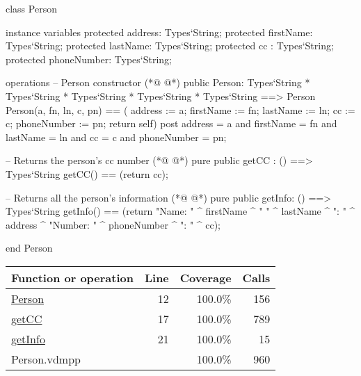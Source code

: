 \begin{vdmpp}[breaklines=true]
class Person

instance variables
  protected address: Types`String;
  protected firstName: Types`String;
  protected lastName: Types`String;
  protected cc : Types`String;
  protected phoneNumber: Types`String;
  
operations
 -- Person constructor
(*@
\label{Person:12}
@*)
 public Person: Types`String * Types`String * Types`String * Types`String * Types`String ==> Person
  Person(a, fn, ln, c, pn) == ( address := a; firstName := fn; lastName := ln; cc := c; phoneNumber := pn; return self)
 post address = a and firstName = fn and lastName = ln and cc = c and phoneNumber = pn;
 
 -- Returns the person's cc number
(*@
\label{getCC:17}
@*)
 pure public getCC : () ==> Types`String
  getCC() == (return cc);
 
 -- Returns all the person's information
(*@
\label{getInfo:21}
@*)
 pure public getInfo: () ==> Types`String
  getInfo() == (return "Name: " ^ firstName ^ " " ^ lastName ^ "\nAddress: " ^ address ^ "\nPhone Number: " ^ phoneNumber ^ "\nCC: " ^ cc);

end Person
\end{vdmpp}
\bigskip
\begin{longtable}{|l|r|r|r|}
\hline
Function or operation & Line & Coverage & Calls \\
\hline
\hline
\hyperref[Person:12]{Person} & 12&100.0\% & 156 \\
\hline
\hyperref[getCC:17]{getCC} & 17&100.0\% & 789 \\
\hline
\hyperref[getInfo:21]{getInfo} & 21&100.0\% & 15 \\
\hline
\hline
Person.vdmpp & & 100.0\% & 960 \\
\hline
\end{longtable}

